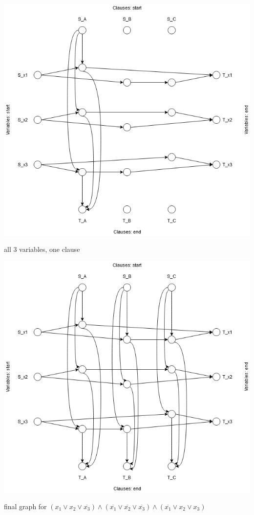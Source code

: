 \documentclass[a4paper]{article}
\begin{document}
\begin{center}
    \includegraphics[scale=.5]{hw11-1clause.png}
    
    \caption{all 3 variables, one clause}
\end{center}

\begin{center}
    \includegraphics[scale=.5]{hw11-final.png}
    
    \caption{final graph for $(x_1 \vee x_2 \vee \overline{x_3}) \wedge (\overline{x_1} \vee \overline{x_2} \vee \overline{x_3}) \wedge (\overline{x_1} \vee x_2 \vee x_3)$ }
\end{center}
\end{document}
